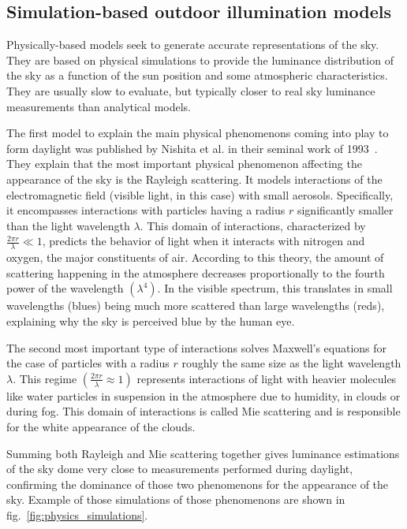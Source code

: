 \subsection{Simulation-based outdoor illumination models}

Physically-based models seek to generate accurate representations of the sky. They are based on physical simulations to provide the luminance distribution of the sky as a function of the sun position and some atmospheric characteristics. They are usually slow to evaluate, but typically closer to real sky luminance measurements than analytical models.

The first model to explain the main physical phenomenons coming into play to form daylight was published by Nishita et al. in their seminal work of 1993~\cite{nishita1993display}. They explain that the most important physical phenomenon affecting the appearance of the sky is the Rayleigh scattering. It models interactions of the electromagnetic field (visible light, in this case) with small aerosols. Specifically, it encompasses interactions with particles having a radius $r$ significantly smaller than the light wavelength $\lambda$. This domain of interactions, characterized by $\frac{2\pi r}{\lambda} \ll 1$, predicts the behavior of light when it interacts with nitrogen and oxygen, the major constituents of air. According to this theory, the amount of scattering happening in the atmosphere decreases proportionally to the fourth power of the wavelength $\left(\lambda^4\right)$. In the visible spectrum, this translates in small wavelengths (blues) being much more scattered than large wavelengths (reds), explaining why the sky is perceived blue by the human eye.

The second most important type of interactions solves Maxwell's equations for the case of particles with a radius $r$ roughly the same size as the light wavelength $\lambda$. This regime $\left( \frac{2\pi r}{\lambda} \approx 1 \right)$ represents interactions of light with heavier molecules like water particles in suspension in the atmosphere due to humidity, in clouds or during fog. This domain of interactions is called Mie scattering and is responsible for the white appearance of the clouds.

Summing both Rayleigh and Mie scattering together gives luminance estimations of the sky dome very close to measurements performed during daylight, confirming the dominance of those two phenomenons for the appearance of the sky. Example of those simulations of those phenomenons are shown in fig.~\ref{fig:physics_simulations}.

